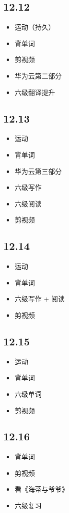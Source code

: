 \documentclass[UTF8]{ctexart}
\begin{document}
\subsection*{12.12}
\begin{itemize}
    \item 运动（持久）
    \item 背单词
    \item 剪视频
    \item 华为云第二部分
    \item 六级翻译提升
\end{itemize}

\subsection*{12.13}
\begin{itemize}
    \item 运动
    \item 背单词
    \item 华为云第三部分
    \item 六级写作
    \item 六级阅读
    \item 剪视频
\end{itemize}

\subsection*{12.14}
\begin{itemize}
    \item 运动
    \item 背单词
    \item 六级写作 + 阅读
    \item 剪视频
\end{itemize}

\subsection*{12.15}
\begin{itemize}
    \item 运动
    \item 背单词
    \item 六级单词
    \item 剪视频
\end{itemize}

\subsection*{12.16}
\begin{itemize}
    \item 背单词
    \item 剪视频
    \item 看《海蒂与爷爷》
    \item 六级复习
\end{itemize}
\end{document}
